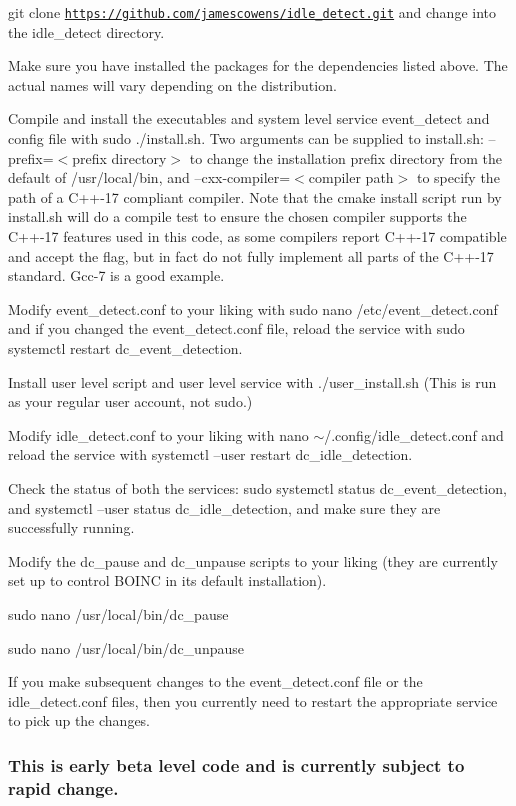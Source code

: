 \begin{DoxyEnumerate}
\item git clone \href{https://github.com/jamescowens/idle_detect.git}{\tt https\+://github.\+com/jamescowens/idle\+\_\+detect.\+git} and change into the idle\+\_\+detect directory.
\item Make sure you have installed the packages for the dependencies listed above. The actual names will vary depending on the distribution.
\item Compile and install the executables and system level service event\+\_\+detect and config file with sudo ./install.sh. Two arguments can be supplied to install.\+sh\+: --prefix=$<$prefix directory$>$ to change the installation prefix directory from the default of /usr/local/bin, and --cxx-\/compiler=$<$compiler path$>$ to specify the path of a C++-\/17 compliant compiler. Note that the cmake install script run by install.\+sh will do a compile test to ensure the chosen compiler supports the C++-\/17 features used in this code, as some compilers report C++-\/17 compatible and accept the flag, but in fact do not fully implement all parts of the C++-\/17 standard. Gcc-\/7 is a good example.
\item Modify event\+\_\+detect.\+conf to your liking with sudo nano /etc/event\+\_\+detect.conf and if you changed the event\+\_\+detect.\+conf file, reload the service with sudo systemctl restart dc\+\_\+event\+\_\+detection.
\item Install user level script and user level service with ./user\+\_\+install.sh (This is run as your regular user account, not sudo.)
\item Modify idle\+\_\+detect.\+conf to your liking with nano $\sim$/.config/idle\+\_\+detect.\+conf and reload the service with systemctl --user restart dc\+\_\+idle\+\_\+detection.
\item Check the status of both the services\+: sudo systemctl status dc\+\_\+event\+\_\+detection, and systemctl --user status dc\+\_\+idle\+\_\+detection, and make sure they are successfully running.
\item Modify the dc\+\_\+pause and dc\+\_\+unpause scripts to your liking (they are currently set up to control B\+O\+I\+NC in its default installation).
\end{DoxyEnumerate}
\begin{DoxyItemize}
\item sudo nano /usr/local/bin/dc\+\_\+pause
\item sudo nano /usr/local/bin/dc\+\_\+unpause
\end{DoxyItemize}
\begin{DoxyEnumerate}
\item If you make subsequent changes to the event\+\_\+detect.\+conf file or the idle\+\_\+detect.\+conf files, then you currently need to restart the appropriate service to pick up the changes.
\end{DoxyEnumerate}

\subsubsection*{This is early beta level code and is currently subject to rapid change.}